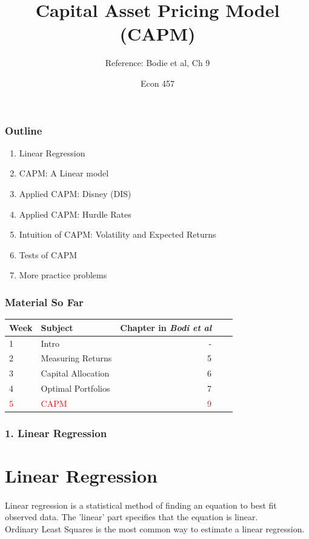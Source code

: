 \documentclass{beamer}
\title{Capital Asset Pricing Model (CAPM)}
\subtitle{Reference: Bodie et al, Ch 9}
\author{Econ 457}
\date{\week}
\begin{document}
\frame{\titlepage}



\begin{frame}
    \frametitle{Outline}

    \begin{enumerate}
        \item Linear Regression
        \item CAPM: A Linear model
        \item Applied CAPM: Disney (DIS)
        \item Applied CAPM: Hurdle Rates
        \item Intuition of CAPM: Volatility and Expected Returns
        \item Tests of CAPM
        \item More practice problems
    \end{enumerate}
\end{frame}

\begin{frame}
    \frametitle{Material So Far}

    \begin{table}
        \begin{tabular}{llrrr}
        \toprule
         Week & Subject & Chapter in \textit{Bodi et al} \\
        \midrule
        1 & Intro  &  - \\
        2 & Measuring Returns & 5 \\
        3 & Capital Allocation & 6 \\
        4 & Optimal Portfolios & 7 \\
        \textcolor{red}{5} & \textcolor{red}{CAPM} & \textcolor{red}{9} \\
        \bottomrule
        \end{tabular}
    \end{table}

\end{frame}




\begin{foundframe}[t]
    \frametitle{1. Linear Regression}
    \section{Linear Regression}
    \framesubtitle{}

    Linear regression is a statistical method of finding an equation to best fit observed data.   The 'linear' part specifies that the equation is linear.\\
    \vspace{1em}
    Ordinary Least Squares is the most common way to estimate a linear regression.\\

\end{foundframe}
\end{document}
